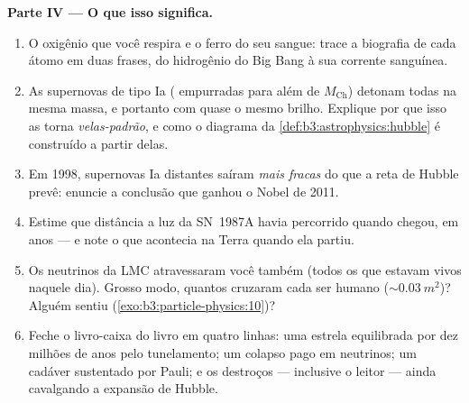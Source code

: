 \begin{problem}
\medskip\noindent\textbf{Parte IV --- O que isso significa.}

\begin{enumerate}[resume]
  \item O oxigênio que você respira e o ferro do seu sangue:
        trace a biografia de cada átomo em duas frases, do
        hidrogênio do Big Bang à sua corrente sanguínea.
  \item As supernovas de tipo Ia ( empurradas para além de
        $M_{\text{Ch}}$) detonam todas na mesma massa, e portanto
        com quase o mesmo brilho. Explique por que isso as torna
        \emph{velas-padrão}, e como o diagrama da
        \cref{def:b3:astrophysics:hubble} é construído
        a partir delas.
  \item Em 1998, supernovas Ia distantes saíram \emph{mais fracas}
        do que a reta de Hubble prevê: enuncie a
        conclusão que ganhou o Nobel de 2011.
  \item Estime que distância a luz da SN~1987A havia percorrido quando
        chegou, em anos --- e note o que acontecia na
        Terra quando ela partiu.
  \item Os neutrinos da LMC atravessaram você também (todos os que
        estavam vivos naquele dia). Grosso modo, quantos cruzaram cada ser
        humano (${\sim}\qty{0.03}{m^2}$)? Alguém sentiu
        (\cref{exo:b3:particle-physics:10})?
  \item Feche o livro-caixa do livro em quatro linhas: uma estrela
        equilibrada por dez milhões de anos pelo tunelamento; um colapso
        pago em neutrinos; um cadáver sustentado por Pauli; e os
        destroços --- inclusive o leitor --- ainda cavalgando
        a expansão de Hubble.
\end{enumerate}
\end{problem}
